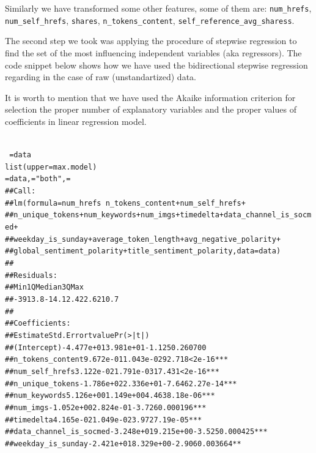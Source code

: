 Similarly we have transformed some other features, some of them are: \texttt{num\_hrefs}, \texttt{num\_self\_hrefs}, \texttt{shares}, \texttt{n\_tokens\_content}, \texttt{self\_reference\_avg\_sharess}.


The second step we took was applying the procedure of stepwise regression to find the set of the most influencing independent variables (aka regressors). The code snippet below shows how we have used the bidirectional stepwise regression regarding in the case of raw (unstandartized) data. 

It is worth to mention that we have used the Akaike information criterion for selection the proper number of explanatory variables and the proper values of coefficients in linear regression model.

\begin{knitrout}
\color{fgcolor}\begin{kframe}
\begin{alltt}
 \hlkwb{<-}  ~ \hlstd{,} \hlstd{)}
 \hlkwb{<-}  ~  = data\hlstd{)}
 \hlkwb{<-}    \hlstd{=} list(upper=max.model)\hlstd{,} 
		 = data,  = "both",  = \hlstd{)}
## Call:
## lm(formula = num_hrefs ~ n_tokens_content + num_self_hrefs + 
##     n_unique_tokens + num_keywords + num_imgs + timedelta + data_channel_is_socmed + 
##     weekday_is_sunday + average_token_length + avg_negative_polarity + 
##     global_sentiment_polarity + title_sentiment_polarity, data = data)
## 
## Residuals:
##     Min      1Q  Median      3Q     Max 
## -3913.8   -14.1     2.4    22.6   210.7 
## 
## Coefficients:
##                             Estimate Std. Error t value Pr(>|t|)    
## (Intercept)               -4.477e+01  3.981e+01  -1.125 0.260700    
## n_tokens_content           9.672e-01  1.043e-02  92.718  < 2e-16 ***
## num_self_hrefs             3.122e-02  1.791e-03  17.431  < 2e-16 ***
## n_unique_tokens           -1.786e+02  2.336e+01  -7.646 2.27e-14 ***
## num_keywords               5.126e+00  1.149e+00   4.463 8.18e-06 ***
## num_imgs                  -1.052e+00  2.824e-01  -3.726 0.000196 ***
## timedelta                  4.165e-02  1.049e-02   3.972 7.19e-05 ***
## data_channel_is_socmed    -3.248e+01  9.215e+00  -3.525 0.000425 ***
## weekday_is_sunday         -2.421e+01  8.329e+00  -2.906 0.003664 ** 

\end{alltt}
\end{kframe}
\end{knitrout}
